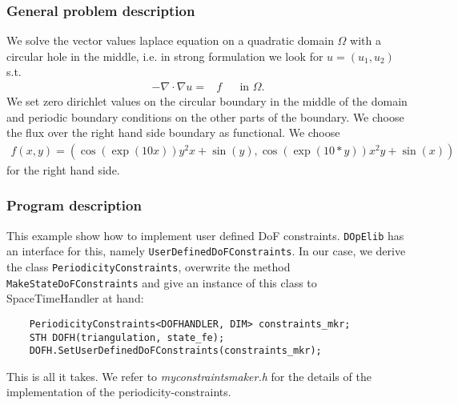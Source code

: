 \subsubsection{General problem description}
We solve the vector values laplace equation on a quadratic domain $\Omega$ with a circular hole in the middle, i.e. in strong formulation we look for $u=(u_1,u_2)$ s.t.
\begin{align*}
-\nabla \cdot \nabla u =& f &&\text{in }\Omega.
\end{align*}
We set zero dirichlet values on the circular boundary in the middle of the domain and periodic boundary conditions on the other parts of the boundary. We choose the flux over the right hand side boundary as functional. We choose
\begin{align*}
f(x,y) = \left(\cos\left(\exp(10  x)\right)  y^2x + \sin(y), \cos\left(\exp(10 * y)\right)x^2y + \sin(x)\right)
\end{align*}
for the right hand side.
\subsubsection{Program description}
This example show how to implement user defined DoF constraints. \texttt{DOpElib} has an interface for this, namely \texttt{UserDefinedDoFConstraints}. In our case, we derive the class \texttt{PeriodicityConstraints}, overwrite the method \texttt{MakeStateDoFConstraints} and give an instance of this class to SpaceTimeHandler at hand:
\begin{verbatim}
 	PeriodicityConstraints<DOFHANDLER, DIM> constraints_mkr;
 	STH DOFH(triangulation, state_fe);
 	DOFH.SetUserDefinedDoFConstraints(constraints_mkr);
\end{verbatim}
This is all it takes. We refer to \textit{myconstraintsmaker.h} for the details of the implementation of the periodicity-constraints.
